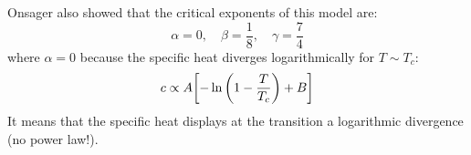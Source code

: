 \documentclass[../main/main.tex]{subfiles}
\begin{document}
Onsager also showed that the critical exponents of this model are:
\begin{equation*}
\alpha =0,\quad \beta=\frac{1}{8}, \quad \gamma = \frac{7}{4}
\end{equation*}
where \(\alpha=0\)  because the specific heat diverges logarithmically for \(T \sim T_c\):
\begin{equation*}
  c \propto A \qty[-\ln{\qty(1- \frac{T}{T_c}) } + B  ]
\end{equation*}
It means that the specific heat displays at the transition a logarithmic divergence (no power law!).
\end{document}
